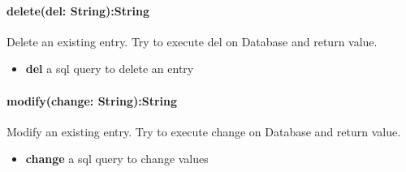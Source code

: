 \paragraph{delete(del: String):String} Delete an existing entry. Try to execute del on Database and return value.
\begin{itemize}
	\item \textbf{del} 
	a sql query to delete an entry
\end{itemize}

\paragraph{modify(change: String):String} Modify an existing entry. Try to execute change on Database and return value.
\begin{itemize}
	\item \textbf{change} 
	a sql query to change values
\end{itemize}


\newpage